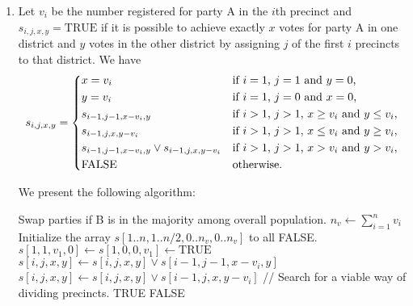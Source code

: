 \documentclass{article}
\begin{document}
\begin{enumerate}
    \item Let $v_i$ be the number registered for party A in the $i$th precinct and $s_{i, j, x, y} = \mathrm{TRUE}$ if it is possible to achieve exactly $x$ votes for party A in one district and $y$ votes in the other district by assigning $j$ of the first $i$ precincts to that district. We have
    \[
        s_{i, j, x, y} = \begin{dcases*}
            x = v_i & if $i = 1$, $j = 1$ and $y = 0$,\\
            y = v_i & if $i = 1$, $j = 0$ and $x = 0$,\\
            s_{i - 1, j - 1, x - v_i, y} & if $i > 1$, $j > 1$, $x \ge v_i$ and $y \le v_i$,\\
            s_{i - 1, j, x, y - v_i} & if $i > 1$, $j > 1$, $x \le v_i$ and $y \ge v_i$,\\
            s_{i - 1, j - 1, x - v_i, y} \lor s_{i - 1, j, x, y - v_i} & if $i > 1$, $j > 1$, $x > v_i$ and $y > v_i$,\\
            \mathrm{FALSE} & otherwise.
        \end{dcases*}
    \]

    We present the following algorithm:
    \begin{algorithmic}[1]
        \State Swap parties if B is in the majority among overall population.
        \State $n_v \gets \sum_{i = 1}^n v_i$
        \State Initialize the array $s[1..n, 1..n/2, 0..n_v, 0..n_v]$ to all FALSE.
        \State $s[1, 1, v_1, 0] \gets s[1, 0, 0, v_1] \gets \mathrm{TRUE}$
                            \State $s[i, j, x, y] \gets s[i, j, x, y] \lor s[i - 1, j - 1, x - v_i, y]$
                        \EndIf
                            \State $s[i, j, x, y] \gets s[i, j, x, y] \lor s[i - 1, j, x, y - v_i]$
                        \EndIf
                    \EndFor
                \EndFor
            \EndFor
        \EndFor
        \State // Search for a viable way of dividing precincts.
                    \State \Return TRUE
                \EndIf
            \EndFor
        \EndFor
        \State \Return FALSE
    \end{algorithmic}


\end{enumerate}
\end{document}
